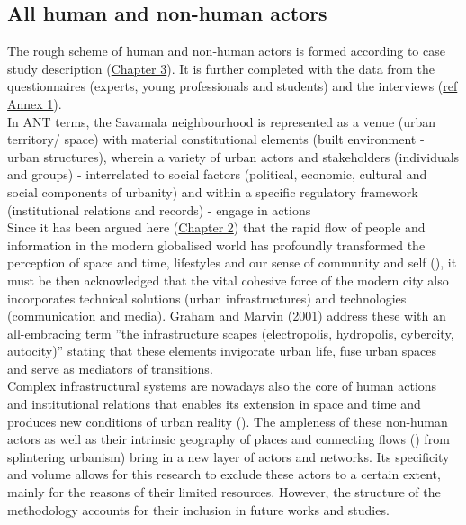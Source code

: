 \documentclass[11pt]{report}
\begin{document}
\subsection{All human and non-human actors}

The rough scheme of human and non-human actors is formed according to case study description
(\href{ref}{Chapter 3}). It is further completed with the data from the questionnaires (experts, young professionals and students) and the interviews
(\href{ref}{ref Annex 1}).
\\

In ANT terms, the Savamala neighbourhood is represented as a venue (urban territory/ space) with material constitutional elements (built environment - urban structures), wherein a variety of urban actors and stakeholders (individuals and groups) - interrelated to social factors (political, economic, cultural and social components of urbanity) and within a specific regulatory framework (institutional relations and records) - engage in actions
\\

Since it has been argued here (\href{ref}{Chapter 2}) that the rapid flow of people and information in the modern globalised world has profoundly transformed the perception of space and time, lifestyles and our sense of community and self (\href{Ellin}{\citealt{ellin_postmodern_1999}}), it must be then acknowledged that the vital cohesive force of the modern city also incorporates technical solutions (urban infrastructures) and technologies (communication and media).
Graham and Marvin (2001) address these with an all-embracing term ”the infrastructure scapes (electropolis, hydropolis, cybercity, autocity)” stating that these elements invigorate urban life, fuse urban spaces and serve as mediators of transitions.
\\

Complex infrastructural systems are nowadays also the core of human actions and institutional relations that enables its extension in space and time and produces new conditions of urban reality (\href{Graham}{\citealt{graham_splintering_2001}}).
The ampleness of these non-human actors as well as their intrinsic geography of places and connecting flows (\href{Swyngedouw}{\citealt{swyngedouw_communication_1993}}) from splintering urbanism) bring in a new layer of actors and networks. Its specificity and volume allows for this research to exclude these actors to a certain extent, mainly for the reasons of their limited resources. However, the structure of the methodology accounts for their inclusion in future works and studies.
\\
\end{document}
